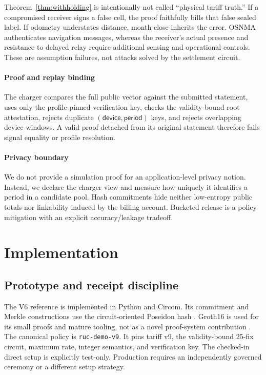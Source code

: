\documentclass[conference]{IEEEtran}
\theoremstyle{plain}
\theoremstyle{definition}
\begin{document}
Theorem~\ref{thm:withholding} is intentionally not called ``physical tariff
truth.'' If a compromised receiver signs a false cell, the proof faithfully
bills that false sealed label. If odometry understates distance, month
close inherits the error. OSNMA authenticates navigation messages, whereas the
receiver's actual presence and resistance to delayed relay require additional
sensing and operational controls. These are assumption failures, not attacks
solved by the settlement circuit.

\paragraph{Proof and replay binding}
The charger compares the full public vector against the submitted statement,
uses only the profile-pinned verification key, checks the validity-bound root
attestation, rejects duplicate $(\mathsf{device},\mathsf{period})$ keys, and
rejects overlapping device windows. A valid proof detached from its original
statement therefore fails signal equality or profile resolution.

\paragraph{Privacy boundary}
We do not provide a simulation proof for an application-level privacy notion.
Instead, we declare the charger view and measure how uniquely it identifies a
period in a candidate pool. Hash commitments hide neither low-entropy public
totals nor linkability induced by the billing account. Bucketed release is a
policy mitigation with an explicit accuracy/leakage tradeoff.

\section{Implementation}

\subsection{Prototype and receipt discipline}

The V6 reference is implemented in Python and Circom. Its commitment and Merkle
constructions use the circuit-oriented Poseidon hash \cite{Grassi2021Poseidon}.
Groth16 is used for its
small proofs and mature tooling, not as a novel proof-system contribution
\cite{Groth2016}. The canonical policy is \texttt{ruc-demo-v9}. It pins tariff v9, the
validity-bound 25-fix circuit, maximum rate, integer semantics, and verification
key. The checked-in direct setup is explicitly test-only. Production requires
an independently governed ceremony or a different setup strategy.
\end{document}
